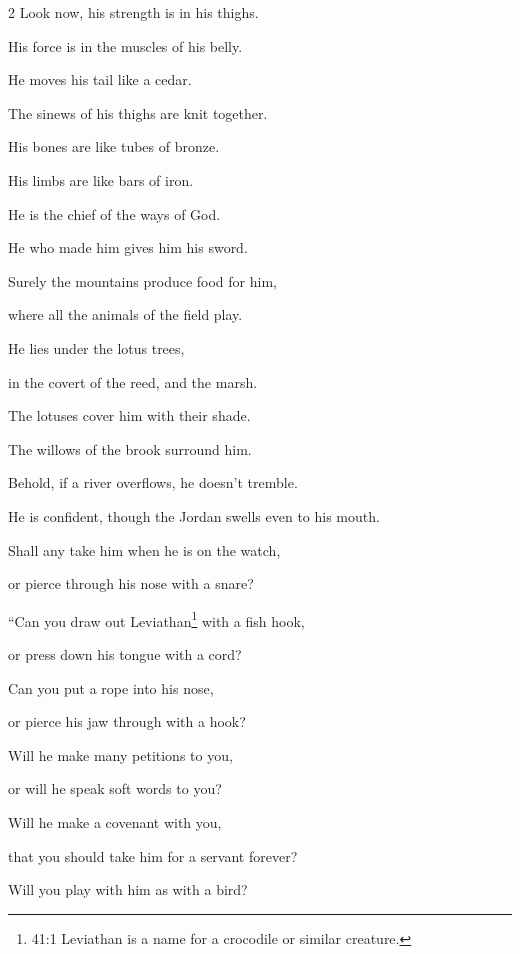 \begin{multicols}{2}
	\myverse{}Look now, his strength is in his thighs.
	
	His force is in the muscles of his belly.
	
	\myverse{}He moves his tail like a cedar.
	
	The sinews of his thighs are knit together.
	
	\myverse{}His bones are like tubes of bronze.
	
	His limbs are like bars of iron.
	
\vspace{\baselineskip}
	
	\myverse{}He is the chief of the ways of God.
	
	He who made him gives him his sword.
	
	\myverse{}Surely the mountains produce food for him,
	
	where all the animals of the field play.
	
	\myverse{}He lies under the lotus trees,
	
	in the covert of the reed, and the marsh.
	
	\myverse{}The lotuses cover him with their shade.
	
	The willows of the brook surround him.
	
	\myverse{}Behold, if a river overflows, he doesn’t tremble.
	
	He is confident, though the Jordan swells even to his mouth.
	
	\myverse{}Shall any take him when he is on the watch,
	
	or pierce through his nose with a snare?
	
	
	
	
	\mychapter{} \myverse*{}“Can you draw out Leviathan\footnote{41:1 Leviathan is a name for a crocodile or similar creature.} with a fish hook,
	
	\quad\quad or press down his tongue with a cord?
	
	\myverse{}Can you put a rope into his nose,
	
	or pierce his jaw through with a hook?
	
	\myverse{}Will he make many petitions to you,
	
	or will he speak soft words to you?
	
	\myverse{}Will he make a covenant with you,
	
	that you should take him for a servant forever?
	
	\myverse{}Will you play with him as with a bird?
	

\end{multicols}
